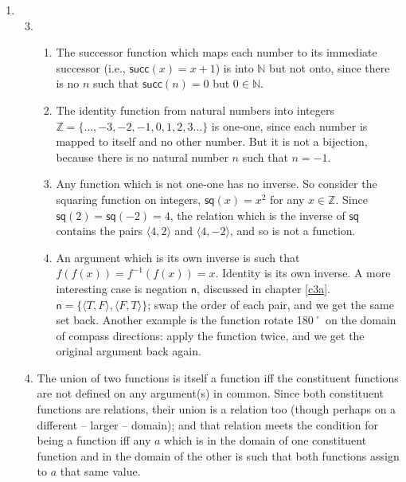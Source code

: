 {\begin{enumerate}
\begin{enumerate}
		For example, let $X = \{1,2\}, Y=\{2,3\}$. $\{1,3\}\in \wp(X\cup Y)$, but $\{1,3\}\notin \wp(X)\cup \wp(Y)$; by extensionality, $\wp(X) \cup \wp(Y) \neq \wp(X \cup Y)$. 
	\end{enumerate}\setcounter{enumi}{16}
	\item \begin{enumerate}
		\setcounter{enumii}{2}
		\item \begin{enumerate} 
			\item The successor function which maps each number to its immediate successor (i.e., $\mathsf{succ}(x) = x+1$) is into $\mathbb{N}$ but not onto, since there is no $n$ such that $\mathsf{succ}(n) = 0$ but $0 \in \mathbb{N}$.
			\item The identity function from natural numbers into integers $\mathbb{Z} = \{…,-3,-2,-1,0,1,2,3…\}$ is one-one, since each number is mapped to itself and no other number. But it is not a bijection, because there is no natural number $n$ such that $n = -1$.
			\item Any function which is not one-one has no inverse. So consider the squaring function on integers, $\mathsf{sq}(x) = x^{2}$ for any $x\in\mathbb{Z}$. Since $\mathsf{sq}(2)=\mathsf{sq}(-2)=4$, the relation which is the inverse of $\mathsf{sq}$ contains the pairs $\langle 4,2\rangle$ and $\langle 4,-2\rangle$, and so is not a function.
			\item An argument which is its own inverse is such that $f(f(x)) = f^{-1}(f(x)) = x$. Identity is its own inverse. A more interesting case is negation $\mathsf{n}$, discussed in chapter \autoref{c3a}. $\mathsf{n}=\{\langle T,F\rangle,\langle F,T\rangle\}$; swap the order of each pair, and we get the same set back. Another example is the function \textsf{rotate 180˚} on the domain of compass directions: apply the function twice, and we get the original argument back again. 
		\end{enumerate}
		\item The union of two functions is itself a function iff the constituent functions are not defined on any argument(s) in common. Since both constituent functions are relations, their union is a relation too (though perhaps on a different – larger – domain); and that relation meets the condition for being a function iff any $a$ which is in the domain of one constituent function and in the domain of the other is such that both functions assign to $a$ that same value.   
	\end{enumerate}
\end{enumerate}

}
